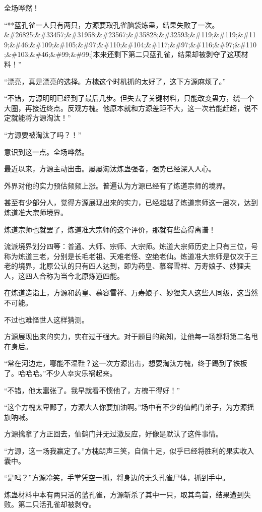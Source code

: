 \begin{this_body}
全场哗然！

“**蓝孔雀一人只有两只，方源要取孔雀脑袋炼蛊，结果失败了一次。\&\#26825;\&\#33457;\&\#31958;\&\#23567;\&\#35828;\&\#32593;\&\#119;\&\#119;\&\#119;\&\#46;\&\#109;\&\#105;\&\#97;\&\#110;\&\#104;\&\#117;\&\#97;\&\#116;\&\#97;\&\#110;\&\#103;\&\#46;\&\#99;\&\#99;]本来还剩下第二只蓝孔雀，结果却被剥夺了这项材料！”

“漂亮，真是漂亮的选择。方槐这个时机抓的太好了，这下方源麻烦了。”

“不错，方源明明已经到了最后几步。但失去了关键材料，只能改变蛊方，绕一个大圈，再接近终点。反观方槐。他原本就和方源差距不大，这一次若能赶超，说不定就能将方源淘汰！”

“方源要被淘汰了吗？！”

意识到这一点。全场哗然。

最近以来，方源主动出击。屡屡淘汰炼蛊强者，强势已经深入人心。

外界对他的实力预估频频上涨。普遍认为方源已经有了炼道宗师的境界。

甚至有少部分人，觉得方源展现出来的实力，已经超越了炼道宗师这一层次，达到炼道准大宗师境界。

炼道宗师也就罢了，炼道准大宗师的这个评价，那就有些高得离谱！

流派境界划分四等：普通、大师、宗师、大宗师。炼道大宗师历史上只有三位，号称为炼道三老，分别是长毛老祖、天难老怪、空绝老仙。炼道准大宗师是仅次于三老的境界，北原公认的只有四人达到，即为药皇、慕容雪祥、万寿娘子、妙狸夫人，这四人合称为当今北原炼道四能。

在炼道造诣上，方源和药皇、慕容雪祥、万寿娘子、妙狸夫人这些人同级，这当然不可能。

不过也难怪世人这样猜测。

方源展现出来的实力，实在过于强大。对于题目的熟知，让他每一场都将第二名甩在身后。

“常在河边走，哪能不湿鞋？这一次方源出击，想要淘汰方槐，终于踢到了铁板了。哈哈哈。”不少人幸灾乐祸起来。

“不错，他太嚣张了。我早就看不惯他了，方槐干得好！”

“这个方槐太卑鄙了，方源大人你要加油啊。”场中有不少的仙鹤门弟子，为方源摇旗呐喊。

方源擒拿了方正回去，仙鹤门并无过激反应，好像是默认了这件事情。

“方源，这一场我赢定了。”方槐朗声三笑，自信十足，似乎已经将胜利的果实收入囊中。

“是吗？”方源冷笑，手掌凭空一抓，将身边的无头孔雀尸体，抓到手中。

炼蛊材料中本有两只活的蓝孔雀，方源斩杀了其中一只，取其鸟首，结果遭到失败。第二只活孔雀却被剥夺。


\end{this_body}

